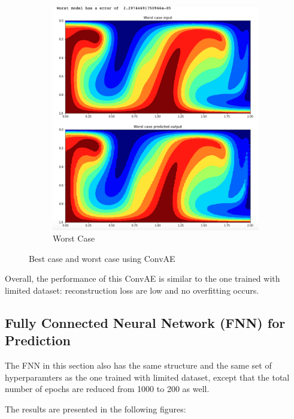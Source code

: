 \begin{figure}[H]
\begin{subfigure}{0.45\textwidth}
    \includegraphics[width=\textwidth]{Report LaTeX/figures/mantle_convection_images/larger_dataset/ConvAE_Worst.png}
    \caption{Worst Case}
    \label{fig:second}
\end{subfigure}
        
\caption{Best case and worst case using ConvAE}
\label{fig:figures}
\end{figure}

Overall, the performance of this ConvAE is similar to the one trained with limited dataset: reconstruction loss are low and no overfitting occurs.


\subsection{Fully Connected Neural Network (FNN) for Prediction}

The FNN in this section also has the same structure and the same set of hyperparamters as the one trained with limited dataset, except that the total number of epochs are reduced from 1000 to 200 as well.

The results are presented in the following figures:

